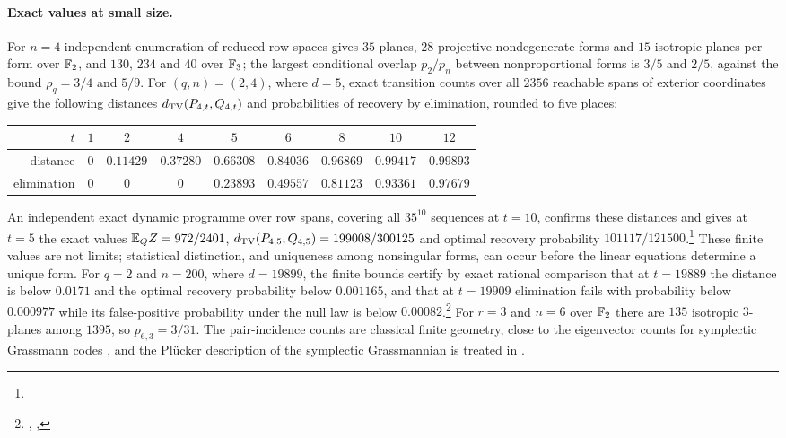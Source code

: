 \paragraph{Exact values at small size.}
For $n=4$ independent enumeration of reduced row spaces gives $35$ planes, $28$ projective
nondegenerate forms and $15$ isotropic planes per form over $\mathbb{F}_2$, and $130$, $234$ and $40$ over
$\mathbb{F}_3$; the largest conditional overlap $p_2/p_n$ between nonproportional forms is $3/5$ and $2/5$,
against the bound $\rho_q=3/4$ and $5/9$. For $(q,n)=(2,4)$, where $d=5$, exact transition counts
over all $2356$ reachable spans of exterior coordinates give the following distances
$d_{\mathrm{TV}}(P_{4,t},Q_{4,t})$ and probabilities of recovery by elimination, rounded to five places:
\begin{center}\small
\begin{tabular}{rcccccccc}
\toprule
$t$ & $1$ & $2$ & $4$ & $5$ & $6$ & $8$ & $10$ & $12$\\
\midrule
distance & $0$ & $0.11429$ & $0.37280$ & $0.66308$ & $0.84036$ & $0.96869$ & $0.99417$ & $0.99893$\\
elimination & $0$ & $0$ & $0$ & $0.23893$ & $0.49557$ & $0.81123$ & $0.93361$ & $0.97679$\\
\bottomrule
\end{tabular}
\end{center}
An independent exact dynamic programme over row spans, covering all $35^{10}$ sequences at $t=10$,
confirms these distances and gives at $t=5$ the exact values $\mathbb{E}_QZ=972/2401$,
$d_{\mathrm{TV}}(P_{4,5},Q_{4,5})=199008/300125$ and optimal recovery probability
$101117/121500$.\footnote{\raggedright{}}
These finite values are not limits; statistical distinction, and uniqueness among nonsingular
forms, can occur before the linear equations determine a unique form. For $q=2$ and $n=200$, where
$d=19899$, the finite bounds certify by exact rational comparison that at $t=19889$ the distance is
below $0.0171$ and the optimal recovery probability below $0.001165$, and that at $t=19909$
elimination fails with probability below $0.000977$ while its false-positive probability under the
null law is below
$0.00082$.\footnote{\raggedright{},
,
}
For $r=3$ and $n=6$ over $\mathbb{F}_2$ there are $135$ isotropic $3$-planes among $1395$, so $p_{6,3}=3/31$.
The pair-incidence counts are classical finite geometry, close to the eigenvector counts for
symplectic Grassmann codes \cite{CardinaliGiuzzi2016Minimum}, and the Pl\"ucker description of the
symplectic Grassmannian is treated in \cite{Blok2003Generating}.

